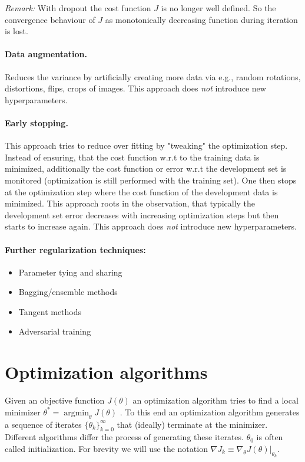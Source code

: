 \documentclass[12pt,a4paper]{article}
\begin{document}
\textit{Remark:} With dropout the cost function $J$ is no longer well defined. So the convergence behaviour of $J$ as monotonically decreasing function during iteration is lost.

\paragraph{Data augmentation.} Reduces the variance by artificially creating more data via e.g., random rotations, distortions, flips, crops of images. This approach does \textit{not} introduce new hyperparameters.

\paragraph{Early stopping.} This approach tries to reduce over fitting by "tweaking"  the optimization step. Instead of ensuring, that the cost function w.r.t to the training data is minimized, additionally the cost function or error w.r.t the development set is monitored (optimization is still performed with the training set). One then stops at the optimization step where the cost function of the development data is minimized. This approach roots in the observation, that typically the development set error decreases with increasing optimization steps but then starts to increase again. This approach does \textit{not} introduce new hyperparameters.

\paragraph{Further regularization techniques\cite{Srihari:regularization_talk}:}
\begin{itemize}
	\setlength\itemsep{0em}
	\item Parameter tying and sharing
	\item Bagging/ensemble methods
	\item Tangent methods
	\item Adversarial training
\end{itemize}

\section{Optimization algorithms} \label{sec:optimizers}
Given an objective function $J(\theta)$ an optimization algorithm tries to find a local minimizer $\theta ^* = \operatorname{argmin}_\theta J(\theta)$ \cite{NoceWrig06}. To this end an optimization algorithm generates a sequence of iterates $\{\theta_k\}_{k=0} ^\infty$ that (ideally) terminate at the minimizer. Different algorithms differ the process of generating these iterates. $\theta_0$ is often called initialization. For brevity we will use the notation $\nabla J_k \equiv \nabla_\theta J(\theta)\rvert_{\theta_k}$.   
\end{document}
